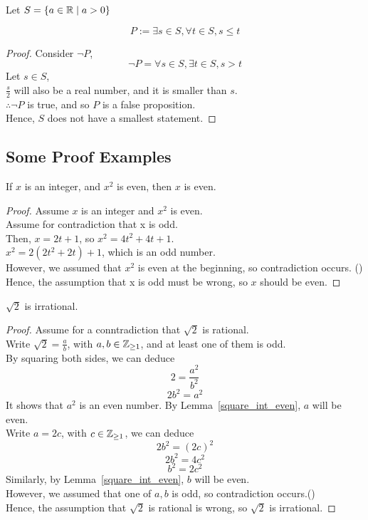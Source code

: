 \documentclass[a4paper]{article}
\begin{document}
Let $S = \{a \in \mathbb{R} \mid a > 0\}$
\begin{prop}
$$P := \exists s \in S, \forall t \in S, s \leq t$$
\end{prop}
\begin{proof}
Consider $\neg P$,
$$\neg P = \forall s \in S, \exists t \in S, s > t$$
Let $s \in S$,\\
$\frac{s}{2}$ will also be a real number, and it is smaller than $s$.\\
$\therefore \neg P$ is true, and so $P$ is a false proposition.\\
Hence, $S$ does not have a smallest statement.
\end{proof}

\subsection{Some Proof Examples}
\begin{nlemma}\label{square_int_even}
If $x$ is an integer, and $x^2$ is even, then $x$ is even.
\end{nlemma}
\begin{proof}
Assume $x$ is an integer and $x^2$ is even.\\
Assume for contradiction that x is odd.\\
Then, $x = 2t + 1$, so $x^2 = 4t^2 + 4t + 1$.\\
$x^2 = 2(2t^2 + 2t) + 1$, which is an odd number.\\
However, we assumed that $x^2$ is even at the beginning, so contradiction occurs. (\contradiction)\\
Hence, the assumption that x is odd must be wrong, so $x$ should be even.
\end{proof}

\begin{nlemma}\label{sqrt2_irr}
$\sqrt{2}$ is irrational.
\end{nlemma}
\begin{proof}
Assume for a conntradiction that $\sqrt{2}$ is rational.\\
Write $\sqrt{2} = \frac{a}{b}$, with $a,b \in \mathbb{Z}_{\geq1}$, and at least one of them is odd.\\
By squaring both sides, we can deduce$$2 = \frac{a^2}{b^2}$$
$$2b^2 = a^2$$
It shows that $a^2$ is an even number. By Lemma~\ref{square_int_even}, $a$ will be even.\\
Write $a = 2c$, with $c \in \mathbb{Z}_{\geq1}$, we can deduce$$2b^2 = (2c)^2$$
$$2b^2 = 4c^2$$
$$b^2 = 2c^2$$
Similarly, by Lemma~\ref{square_int_even}, $b$ will be even.\\
However, we assumed that one of $a,b$ is odd, so contradiction occurs.(\contradiction)\\
Hence, the assumption that $\sqrt{2}$ is rational is wrong, so $\sqrt{2}$ is irrational.
\end{proof}
\end{document}
